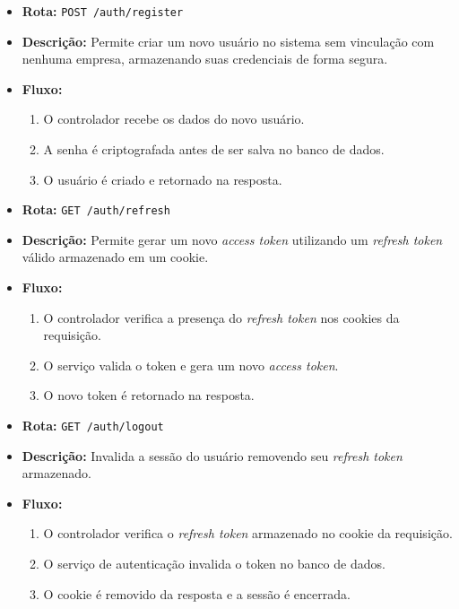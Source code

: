 \begin{itemize}
	\item \textbf{Rota:} \texttt{POST /auth/register}
	\item \textbf{Descrição:} Permite criar um novo usuário no sistema sem vinculação com nenhuma empresa, armazenando suas credenciais de forma segura.
	\item \textbf{Fluxo:}
	\begin{enumerate}
		\item O controlador recebe os dados do novo usuário.
		\item A senha é criptografada antes de ser salva no banco de dados.
		\item O usuário é criado e retornado na resposta.
	\end{enumerate}
\end{itemize}

\begin{itemize}
	\item \textbf{Rota:} \texttt{GET /auth/refresh}
	\item \textbf{Descrição:} Permite gerar um novo \textit{access token} utilizando um \textit{refresh token} válido armazenado em um cookie.
	\item \textbf{Fluxo:}
	\begin{enumerate}
		\item O controlador verifica a presença do \textit{refresh token} nos cookies da requisição.
		\item O serviço valida o token e gera um novo \textit{access token}.
		\item O novo token é retornado na resposta.
	\end{enumerate}
\end{itemize}

\begin{itemize}
	\item \textbf{Rota:} \texttt{GET /auth/logout}
	\item \textbf{Descrição:} Invalida a sessão do usuário removendo seu \textit{refresh token} armazenado.
	\item \textbf{Fluxo:}
	\begin{enumerate}
		\item O controlador verifica o \textit{refresh token} armazenado no cookie da requisição.
		\item O serviço de autenticação invalida o token no banco de dados.
		\item O cookie é removido da resposta e a sessão é encerrada.
	\end{enumerate}
\end{itemize}

